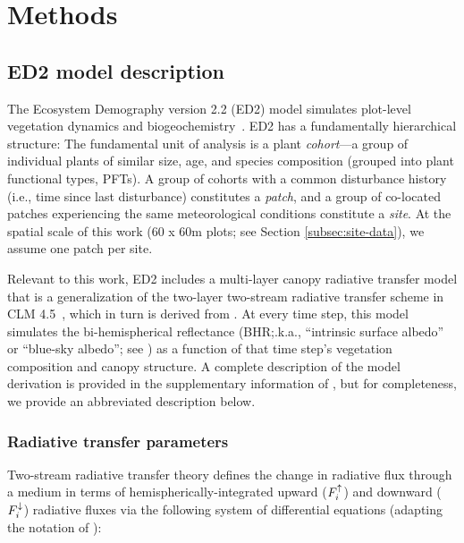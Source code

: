 \section{Methods}

\subsection{ED2 model description}

The Ecosystem Demography version 2.2 (ED2) model simulates plot-level vegetation dynamics and biogeochemistry~\citep{moorcroft_2001_method, medvigy2009mechanistic, longo2019ed2description}.
ED2 has a fundamentally hierarchical structure:
The fundamental unit of analysis is a plant \emph{cohort}---a group of individual plants of similar size, age, and species composition (grouped into plant functional types, PFTs).
A group of cohorts with a common disturbance history (i.e., time since last disturbance) constitutes a \emph{patch},
and a group of co-located patches experiencing the same meteorological conditions constitute a \emph{site}.
At the spatial scale of this work (60 x 60m plots; see Section \ref{subsec:site-data}), we assume one patch per site.

Relevant to this work, ED2 includes a multi-layer canopy radiative transfer model that is a generalization of the two-layer two-stream radiative transfer scheme in CLM 4.5~\citep{clm45_note}, which in turn is derived from \citet{sellers1985canopy}.
At every time step, this model simulates the bi-hemispherical reflectance (BHR;\@a.k.a., ``intrinsic surface albedo'' or ``blue-sky albedo''; see \citealt{schaepman-strub2006reflectance}) as a function of that time step's vegetation composition and canopy structure.
A complete description of the model derivation is provided in the supplementary information of \citet{longo2019ed2description}, but for completeness, we provide an abbreviated description below.

\subsubsection{Radiative transfer parameters}

Two-stream radiative transfer theory \citep{meador1980twostream} defines the change in radiative flux through a medium in terms of hemispherically-integrated upward ($F^{\uparrow}_{i}$) and downward ($F^{\downarrow}_{i}$) radiative fluxes via the following system of differential equations (adapting the notation of \citealt{yuan2017reexamination}):

